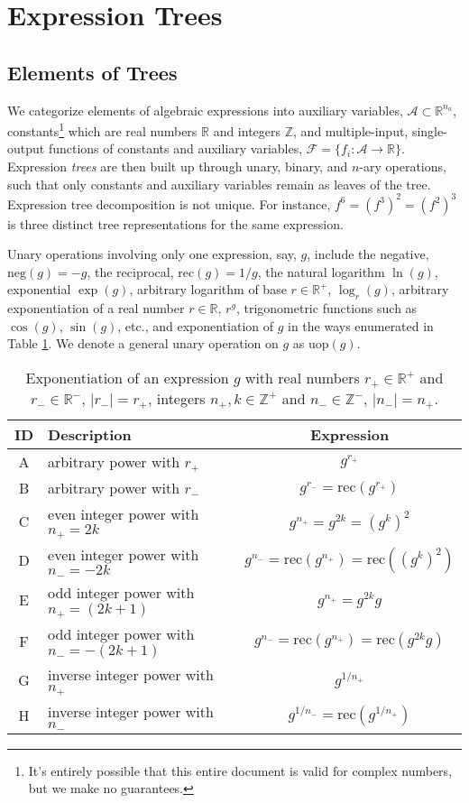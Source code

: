 \documentclass[10pt]{article}
\newcommand{\rec}{\mathrm{rec}}
\renewcommand{\neg}{\mathrm{neg}}
\newcommand{\uop}{\mathrm{uop}}
\begin{document}
\section{Expression Trees} \label{sec: expression trees}
\subsection{Elements of Trees} \label{sec: tree parts}
We categorize elements of algebraic expressions into auxiliary variables, $\mathcal{A}\subset\mathbb{R}^{n_a}$, constants\footnote{It's entirely possible that this entire document is valid for complex numbers, but we make no guarantees.} which are real numbers $\mathbb{R}$ and integers $\mathbb{Z}$, and multiple-input, single-output functions of constants and auxiliary variables, $\mathcal{F}=\{f_i\colon \mathcal{A}\to\mathbb{R}\}$.
Expression \emph{trees} are then built up through unary, binary, and $n$-ary operations, such that only constants and auxiliary variables remain as leaves of the tree.
Expression tree decomposition is not unique.
For instance, $f^6 = (f^3)^2 = (f^2)^3$ is three distinct tree representations for the same expression.

Unary operations involving only one expression, say, $g$, include the negative, $\neg(g)=-g$, the reciprocal, $\rec(g)=1/g$, the natural logarithm $\ln(g)$, exponential $\exp(g)$, arbitrary logarithm of base $r\in\mathbb{R}^+$, $\log_r(g)$, arbitrary exponentiation of a real number $r\in\mathbb{R}$, $r^g$, trigonometric functions such as $\cos(g)$, $\sin(g)$, etc., and exponentiation of $g$ in the ways enumerated in Table \ref{tab: exponentiation options}.
We denote a general unary operation on $g$ as $\uop(g)$.
\begin{table}[h]
\caption{Exponentiation of an expression $g$ with real numbers $r_+\in\mathbb{R}^+$ and $r_-\in\mathbb{R}^-, \,|r_-|=r_+$, integers $n_+, k\in\mathbb{Z}^+$ and $n_-\in\mathbb{Z}^-, \,|n_-|=n_+$.}
\begin{center}
\begin{tabular}{c|l|c}
	ID & Description & Expression \\
	\hline
	A & arbitrary power with $r_+$ & $g^{r_+}$ \\
	B & arbitrary power with $r_-$ & $g^{r_-}=\rec(g^{r_+})$ \\
	C & even integer power with $n_+=2k$ & $g^{n_+}=g^{2k}=(g^k)^2$ \\
	D & even integer power with $n_-=-2k$ & $g^{n_-}=\rec(g^{n_+})=\rec((g^k)^2)$ \\
	E & odd integer power with $n_+=(2k+1)$ & $g^{n_+}=g^{2k}g$ \\
	F & odd integer power with $n_-=-(2k+1)$ & $g^{n_-}=\rec(g^{n_+})=\rec(g^{2k}g)$ \\
	G & inverse integer power with $n_+$ & $g^{1/n_+}$ \\
	H & inverse integer power with $n_-$ & $g^{1/n_-}=\rec(g^{1/n_+})$ \\
	\hline
\end{tabular}
\end{center}
\label{tab: exponentiation options}
\end{table}
\end{document}
